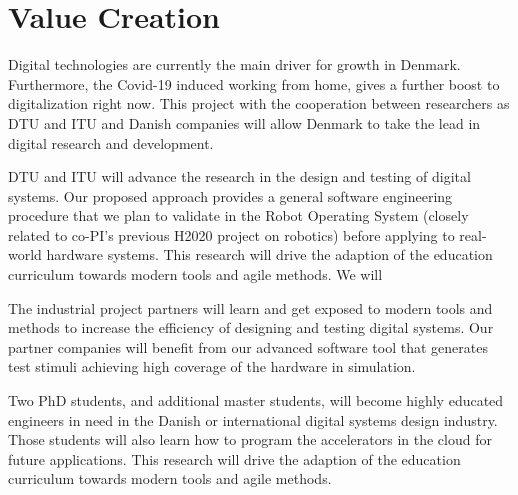 \documentclass[fleqn,12pt]{article}
\begin{document}
%


\section*{Value Creation}









Digital technologies are currently the main driver for growth in Denmark.
Furthermore, the Covid-19 induced working from home, gives a further boost to digitalization right now.
This project with the cooperation between researchers as DTU and ITU and
Danish companies will allow Denmark to take the lead in digital research and development.


DTU and ITU will advance the research in the design and testing of
digital systems. Our proposed approach provides a general software
engineering procedure that we plan to validate in the Robot Operating
System (closely related to co-PI's previous H2020 project on robotics) before
applying to real-world hardware systems.
This research will drive the adaption of the education curriculum towards modern tools and agile methods.
We will



The industrial project partners will learn and get exposed to modern tools and methods to increase the efficiency of designing and testing digital systems. Our partner companies will benefit from our advanced software tool that generates test stimuli achieving high coverage of the hardware in simulation.


Two PhD students, and additional master students, will become highly educated engineers in need in the Danish or international digital systems design industry. Those students will also learn how to program the accelerators in the cloud for future applications. This research will drive the adaption of the education curriculum towards modern tools and agile methods.
\end{document}
